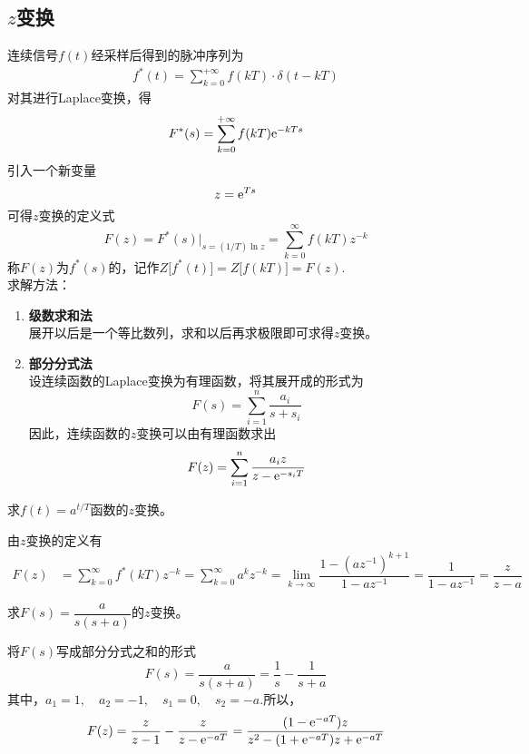 \subsection{$z$变换}
连续信号$f(t)$经采样后得到的脉冲序列为
\begin{align}
	f^*(t) = \sum_{k = 0}^{+\infty}f(kT)\cdot \delta(t -kT)
\end{align}
对其进行Laplace变换，得
\begin{equation}
	F^*(s) = \sum_{k = 0}^{+\infty}f(kT){\rm{e}}^{-kTs}
\end{equation}
引入一个新变量
\begin{equation}
	z = {\rm{e}}^{Ts}
\end{equation}
可得$z$变换的定义式
\begin{equation}
	F(z) = F^*(s)\big|_{s=(1/T)\ln z} = \sum_{k=0}^{\infty} f(kT)z^{-k}
\end{equation}
称$F(z)$为$f^*(s)$的，记作$Z\big[f^*(t)\big]=Z\big[f(kT)\big]=F(z).$\\
求解方法：
\begin{enumerate}[\textbf{方法} 1 ]
	\item \textbf{级数求和法}\\
	展开以后是一个等比数列，求和以后再求极限即可求得$z$变换。
	\item \textbf{部分分式法}\\
	设连续函数的Laplace变换为有理函数，将其展开成的形式为
	\begin{equation}
		F(s) = \sum_{i = 1}^{n} \dfrac{a_i}{s+s_i}
	\end{equation}
	因此，连续函数的$z$变换可以由有理函数求出
	\begin{equation}
		F(z) = \sum_{i=1}^{n} \dfrac{a_i z}{z - {\rm{e}}^{-s_iT}}
	\end{equation}
\end{enumerate}

\examples 求$f(t) = a^{t/T}$函数的$z$变换。

\solve 由$z$变换的定义有
\begin{align*}
	F(z) &= \sum_{k=0}^{\infty} f^*(kT)z^{-k} = \sum_{k = 0}^{\infty} a^{k} z^{-k}= \lim\limits_{k \to \infty} \dfrac{1 - (az^{-1})^{k+1}}{1-az^{-1}} = \dfrac{1}{1 - az^{-1}} = \dfrac{z}{z-a}
\end{align*}
\clearpage
\vspace*{-2.5em}

\examples 求$F(s) = \dfrac{a}{s(s+a)}$的$z$变换。

\solve 将$F(s)$写成部分分式之和的形式
\[
F(s) = \dfrac{a}{s(s+a)} = \dfrac{1}{s} - \dfrac{1}{s+a}
\]
其中，$a_1 = 1,\quad a_2 = -1,\quad s_1 = 0, \quad s_2 = -a.$所以，
\[
F(z) = \dfrac{z}{z-1} - \dfrac{z}{z - {\rm{e}}^{-aT}} = \dfrac{(1 - {\rm{e}}^{-aT})z}{z^2 - (1 + {\rm{e}}^{-aT})z+{\rm{e}}^{-aT}}
\]

